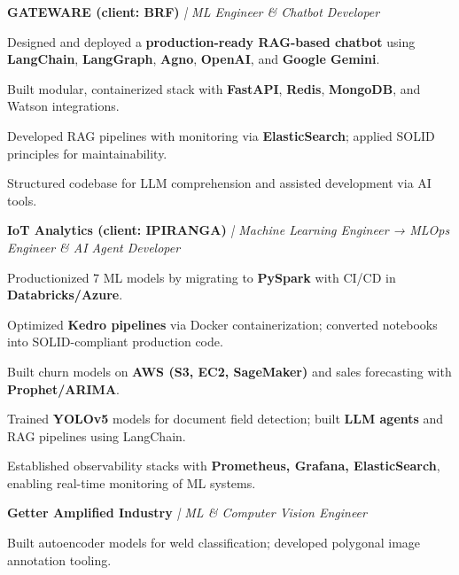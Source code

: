 \documentclass[]{deedy-resume-reversed}
\providecommand{\sectionsep}{\vspace{6pt}} %
\providecommand{\runsubsection}[1]{\vspace{2pt}\noindent\textbf{#1}}
\providecommand{\descript}[1]{\hfill\textit{#1}\par\vspace{-2pt}}
\begin{document}
\begin{minipage}[t]{0.62\textwidth}
\runsubsection{GATEWARE (client: BRF)}
\descript{| ML Engineer \& Chatbot Developer}
\begin{tightemize}
\item Designed and deployed a \textbf{production-ready RAG-based chatbot} using \textbf{LangChain}, \textbf{LangGraph}, \textbf{Agno}, \textbf{OpenAI}, and \textbf{Google Gemini}.
\item Built modular, containerized stack with \textbf{FastAPI}, \textbf{Redis}, \textbf{MongoDB}, and Watson integrations.
\item Developed RAG pipelines with monitoring via \textbf{ElasticSearch}; applied SOLID principles for maintainability.
\item Structured codebase for LLM comprehension and assisted development via AI tools.
\end{tightemize}
\sectionsep

\runsubsection{IoT Analytics (client: IPIRANGA)}
\descript{| Machine Learning Engineer → MLOps Engineer \& AI Agent Developer}
\begin{tightemize}
\item Productionized 7 ML models by migrating to \textbf{PySpark} with CI/CD in \textbf{Databricks/Azure}.
\item Optimized \textbf{Kedro pipelines} via Docker containerization; converted notebooks into SOLID-compliant production code.
\item Built churn models on \textbf{AWS (S3, EC2, SageMaker)} and sales forecasting with \textbf{Prophet/ARIMA}.
\item Trained \textbf{YOLOv5} models for document field detection; built \textbf{LLM agents} and RAG pipelines using LangChain.
\item Established observability stacks with \textbf{Prometheus, Grafana, ElasticSearch}, enabling real-time monitoring of ML systems.
\end{tightemize}
\sectionsep

\runsubsection{Getter Amplified Industry}
\descript{| ML \& Computer Vision Engineer}
\begin{tightemize}
\item Built autoencoder models for weld classification; developed polygonal image annotation tooling.
\end{tightemize}
\sectionsep

\end{minipage}
\end{document}
